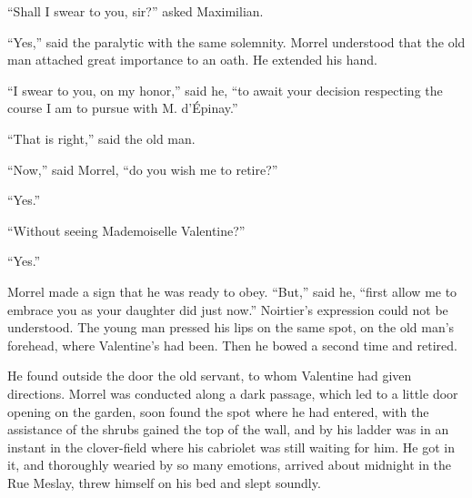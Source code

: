 “Shall I swear to you, sir?” asked Maximilian.

“Yes,” said the paralytic with the same solemnity. Morrel understood
that the old man attached great importance to an oath. He extended his
hand.

“I swear to you, on my honor,” said he, “to await your decision
respecting the course I am to pursue with M. d’Épinay.”

“That is right,” said the old man.

“Now,” said Morrel, “do you wish me to retire?”

“Yes.”

“Without seeing Mademoiselle Valentine?”

“Yes.”

Morrel made a sign that he was ready to obey. “But,” said he, “first
allow me to embrace you as your daughter did just now.” Noirtier’s
expression could not be understood. The young man pressed his lips on
the same spot, on the old man’s forehead, where Valentine’s had been.
Then he bowed a second time and retired.

He found outside the door the old servant, to whom Valentine had given
directions. Morrel was conducted along a dark passage, which led to a
little door opening on the garden, soon found the spot where he had
entered, with the assistance of the shrubs gained the top of the wall,
and by his ladder was in an instant in the clover-field where his
cabriolet was still waiting for him. He got in it, and thoroughly
wearied by so many emotions, arrived about midnight in the Rue Meslay,
threw himself on his bed and slept soundly.

